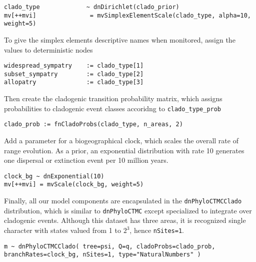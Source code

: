 \begin{snugshade}
\begin{lstlisting}
clado_type             ~ dnDirichlet(clado_prior)
mv[++mvi]               = mvSimplexElementScale(clado_type, alpha=10, weight=5)
\end{lstlisting}
\end{snugshade}

To give the simplex elements descriptive names when monitored, assign the values to deterministic nodes

\begin{snugshade}
\begin{lstlisting}
widespread_sympatry    := clado_type[1]
subset_sympatry        := clado_type[2]
allopatry              := clado_type[3]
\end{lstlisting}
\end{snugshade}

Then create the cladogenic transition probability matrix, which assigns probabilities to cladogenic event classes accoridng to {\tt clado\_type\_prob}

\begin{snugshade}
\begin{lstlisting}
clado_prob := fnCladoProbs(clado_type, n_areas, 2)
\end{lstlisting}
\end{snugshade}

Add a parameter for a biogeographical clock, which scales the overall rate of range evolution.
As a prior, an exponential distribution with rate 10 generates one dispersal or extinction event per 10 million years.

\begin{snugshade}
\begin{lstlisting}
clock_bg ~ dnExponential(10)
mv[++mvi] = mvScale(clock_bg, weight=5)
\end{lstlisting}
\end{snugshade}

Finally, all our model components are encapsulated in the {\tt dnPhyloCTMCClado} distribution, which is similar to {\tt dnPhyloCTMC} except specialized to integrate over cladogenic events. Although this dataset has three areas, it is recognized single character with states valued from 1 to $2^3$, hence {\tt nSites=1}.

\begin{snugshade}
\begin{lstlisting}
m ~ dnPhyloCTMCClado( tree=psi, Q=q, cladoProbs=clado_prob, branchRates=clock_bg, nSites=1, type="NaturalNumbers" )
\end{lstlisting}
\end{snugshade}

